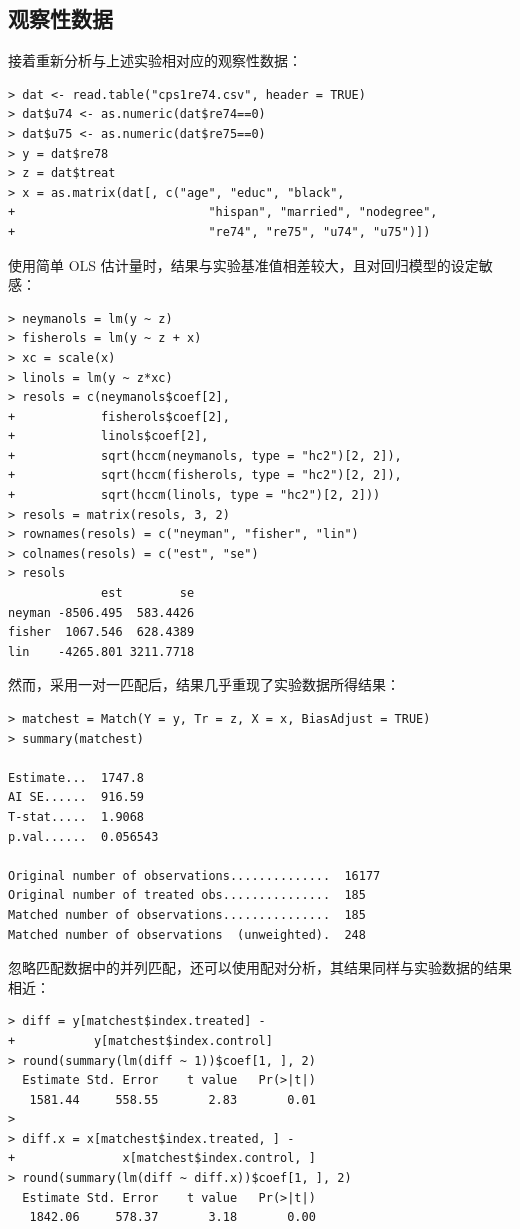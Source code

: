 \subsection{观察性数据}
接着重新分析与上述实验相对应的观察性数据：
\begin{lstlisting}
> dat <- read.table("cps1re74.csv", header = TRUE)
> dat$u74 <- as.numeric(dat$re74==0)
> dat$u75 <- as.numeric(dat$re75==0)
> y = dat$re78
> z = dat$treat
> x = as.matrix(dat[, c("age", "educ", "black",
+                           "hispan", "married", "nodegree",
+                           "re74", "re75", "u74", "u75")])
 \end{lstlisting} 
使用简单 OLS 估计量时，结果与实验基准值相差较大，且对回归模型的设定敏感：
\begin{lstlisting}
> neymanols = lm(y ~ z)
> fisherols = lm(y ~ z + x)
> xc = scale(x)
> linols = lm(y ~ z*xc)
> resols = c(neymanols$coef[2],
+            fisherols$coef[2],
+            linols$coef[2],
+            sqrt(hccm(neymanols, type = "hc2")[2, 2]),
+            sqrt(hccm(fisherols, type = "hc2")[2, 2]),
+            sqrt(hccm(linols, type = "hc2")[2, 2]))
> resols = matrix(resols, 3, 2)
> rownames(resols) = c("neyman", "fisher", "lin")
> colnames(resols) = c("est", "se")
> resols 
             est        se
neyman -8506.495  583.4426
fisher  1067.546  628.4389
lin    -4265.801 3211.7718
  \end{lstlisting} 
  然而，采用一对一匹配后，结果几乎重现了实验数据所得结果：
  \begin{lstlisting}
> matchest = Match(Y = y, Tr = z, X = x, BiasAdjust = TRUE)
> summary(matchest)

Estimate...  1747.8 
AI SE......  916.59 
T-stat.....  1.9068 
p.val......  0.056543 

Original number of observations..............  16177 
Original number of treated obs...............  185 
Matched number of observations...............  185 
Matched number of observations  (unweighted).  248
   \end{lstlisting} 
   
忽略匹配数据中的并列匹配，还可以使用配对分析，其结果同样与实验数据的结果相近：
  \begin{lstlisting}
> diff = y[matchest$index.treated] - 
+           y[matchest$index.control]
> round(summary(lm(diff ~ 1))$coef[1, ], 2)
  Estimate Std. Error    t value   Pr(>|t|) 
   1581.44     558.55       2.83       0.01 
> 
> diff.x = x[matchest$index.treated, ] - 
+               x[matchest$index.control, ]
> round(summary(lm(diff ~ diff.x))$coef[1, ], 2)
  Estimate Std. Error    t value   Pr(>|t|) 
   1842.06     578.37       3.18       0.00 
   \end{lstlisting} 
   

